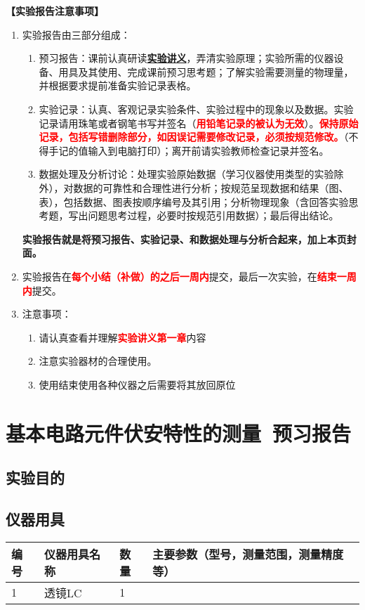 \documentclass[dvipsnames, svgnames,a4paper,11pt]{article}
\newcommand{\exname}{基本电路元件伏安特性的测量}%
\begin{document}
\textbf{【实验报告注意事项】}
\begin{enumerate}
	\item 实验报告由三部分组成：
	\begin{enumerate}
		\item 预习报告：课前认真研读\underline{\textbf{实验讲义}}，弄清实验原理；实验所需的仪器设备、用具及其使用、完成课前预习思考题；了解实验需要测量的物理量，并根据要求提前准备实验记录表格。
	    \item 实验记录：认真、客观记录实验条件、实验过程中的现象以及数据。实验记录请用珠笔或者钢笔书写并签名（\textcolor{red}{\textbf{用铅笔记录的被认为无效}}）。\textcolor{red}{\textbf{保持原始记录，包括写错删除部分，如因误记需要修改记录，必须按规范修改。}}（不得手记的值输入到电脑打印）；离开前请实验教师检查记录并签名。
	    \item 数据处理及分析讨论：处理实验原始数据（学习仪器使用类型的实验除外），对数据的可靠性和合理性进行分析；按规范呈现数据和结果（图、表），包括数据、图表按顺序编号及其引用；分析物理现象（含回答实验思考题，写出问题思考过程，必要时按规范引用数据）；最后得出结论。
	\end{enumerate}
	\textbf{实验报告就是将预习报告、实验记录、和数据处理与分析合起来，加上本页封面。}
	\item 实验报告在\textcolor{red}{\textbf{每个小结（补做）的之后一周内}}提交，最后一次实验，在\textcolor{red}{\textbf{结束一周内}}提交。
	\item 注意事项：\begin{enumerate}
		\item 请认真查看并理解\textcolor{red}{\textbf{实验讲义第一章}}内容
		\item 注意实验器材的合理使用。
		\item 使用结束使用各种仪器之后需要将其放回原位
	\end{enumerate}
\end{enumerate}



\clearpage
\tableofcontents
\clearpage

\setcounter{section}{0}
\section{\exname\ \textbf{预习报告}}
	
\subsection{实验目的}

\subsection{仪器用具}
\begin{table}[htbp]
	\centering
	\renewcommand\arraystretch{1.6}
	\begin{tabular}{p{}|p{}|p{}|p{}}
	\hline
	编号& 仪器用具名称 & 数量 &  主要参数（型号，测量范围，测量精度等） \\
	\hline
	1&透镜LC&1 &\\
	\hline
\end{tabular}
\end{table}
\end{document}
